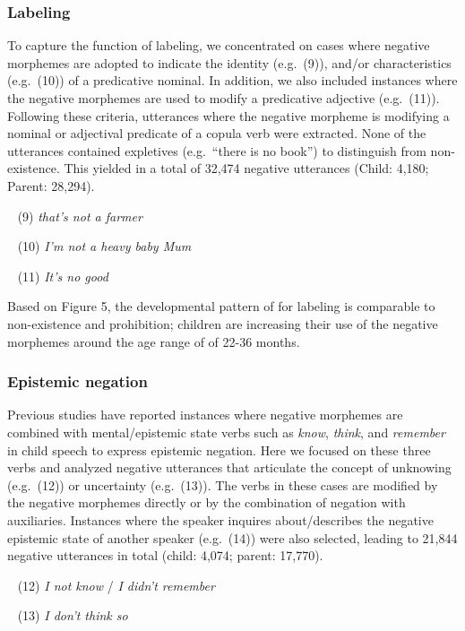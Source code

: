 \documentclass[10pt, letterpaper]{article}
\begin{document}
\hypertarget{labeling}{%
\subsubsection{Labeling}\label{labeling}}

To capture the function of labeling, we concentrated on cases where
negative morphemes are adopted to indicate the identity (e.g.~(9)),
and/or characteristics (e.g.~(10)) of a predicative nominal. In
addition, we also included instances where the negative morphemes are
used to modify a predicative adjective (e.g.~(11)). Following these
criteria, utterances where the negative morpheme is modifying a nominal
or adjectival predicate of a copula verb were extracted. None of the
utterances contained expletives (e.g.~``there is no book'') to
distinguish from non-existence. This yielded in a total of 32,474
negative utterances (Child: 4,180; Parent: 28,294).

~ (9) \emph{that's not a farmer}

~ (10) \emph{I'm not a heavy baby Mum}

~ (11) \emph{It's no good}

Based on Figure 5, the developmental pattern of for labeling is
comparable to non-existence and prohibition; children are increasing
their use of the negative morphemes around the age range of of 22-36
months.

\hypertarget{epistemic-negation}{%
\subsubsection{Epistemic negation}\label{epistemic-negation}}

Previous studies have reported instances where negative morphemes are
combined with mental/epistemic state verbs such as \emph{know},
\emph{think}, and \emph{remember} in child speech to express epistemic
negation. Here we focused on these three verbs and analyzed negative
utterances that articulate the concept of unknowing (e.g.~(12)) or
uncertainty (e.g.~(13)). The verbs in these cases are modified by the
negative morphemes directly or by the combination of negation with
auxiliaries. Instances where the speaker inquires about/describes the
negative epistemic state of another speaker (e.g.~(14)) were also
selected, leading to 21,844 negative utterances in total (child: 4,074;
parent: 17,770).

~ (12) \emph{I not know} / \emph{I didn't remember}

~ (13) \emph{I don't think so}
\end{document}
